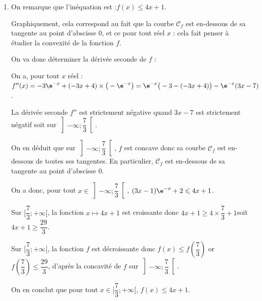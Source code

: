 \begin{enumerate}
\begin{enumerate}
			\item Sur l'intervalle $\big[0  ; 2 \big]$, la fonction $f$ est positive donc l'aire du domaine limité par la courbe $\mathcal{C}_f$, l'axe de abscisses et les droites d'équation $x = 0$ et $x = 2$ est $\mathcal{A}=\displaystyle \int_0^2 f(x) dx$.

			$\begin{aligned}[t] \mathcal{A}&=\displaystyle \int_0^2 f(x) dx \\
			&= \bigg[ F(x) \bigg]_0^2 \\
			&= F(2) - F(0) \\
			&= -8\e^2 +4 +2 \\
			&=6-8\e^2
			\end{aligned}$

			L'aire du domaine limité par la courbe $\mathcal{C}_f$, l'axe de abscisses et les droites d'équation $x = 0$ et $x = 2$ mesure $6-8\e^2$ unités d'aire.
		\end{enumerate}

		\item On remarque que l'inéquation est :\quad $f(x) \leqslant 4x + 1$.

		Graphiquement, cela correspond au fait que la courbe $\mathcal{C}_f$ est en-dessous de sa tangente au point d'abscisse 0, et ce pour tout réel $x$ : cela fait penser à étudier la convexité de la fonction $f$.

		On va donc déterminer la dérivée seconde de $f$ :

		On a, pour tout $x$ réel :\quad  $f''(x)= -3\e^{-x} + (-3x + 4)\times \big(-\e^{-x}\big) = \e^{-x} \big(-3 - (-3x+4)\big)-\e^{-x} (3x-7)$.

		La dérivée seconde $f''$ est strictement négative quand $3x-7$ est strictement négatif soit sur $\left] -\infty  ; \dfrac73 \right[$.

		On en déduit que sur $\left] -\infty  ; \dfrac73 \right[$, $f$ est concave donc sa courbe $\mathcal{C}_f$ est en-dessous de toutes ses tangentes. En particulier, $\mathcal{C}_f$ est en-dessous de sa tangente au point d'abscisse 0.

		On a donc, pour tout $x \in \left] -\infty  ; \dfrac73 \right[$, \quad $(3x - 1)\e^{-x} + 2 \leqslant 4x + 1$.

		Sur $\bigg[ \dfrac73  ; +\infty \bigg[$, la fonction \quad $x \longmapsto 4x+1$ \quad est croissante donc \quad $4x+1 \geqslant 4 \times \dfrac73 +1$\quad soit \quad $4x+1 \geqslant \dfrac{29}{3}$.

		Sur $\bigg[ \dfrac73  ; +\infty \bigg[$, la fonction $f$ est décroissante donc \quad $f(x) \leqslant f\left( \dfrac73 \right)$ \quad or $f\left( \dfrac73 \right) \leqslant \dfrac{29}{3}$, \quad d'après la concavité de $f$ sur $\left] -\infty  ; \dfrac73 \right[$.

		On en conclut que pour tout $x \in \bigg[ \dfrac73  ; +\infty \bigg[$, \quad $f(x) \leqslant 4x+1$.
	\end{enumerate}


